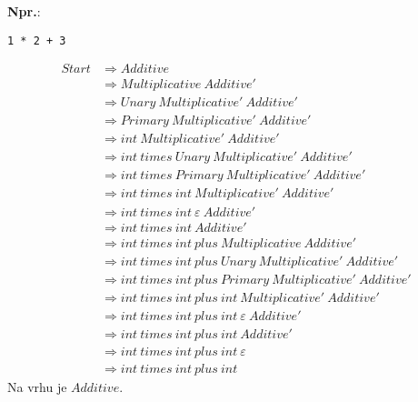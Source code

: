 \documentclass{report}
\newcommand{\Ex}{\textbf{Npr.}:\ }
\newcommand{\Null}{\varepsilon}
\newcommand{\Spc}{\ }
\newlength{\arrow}
\newcommand{\Derive}{\Rightarrow}
\newcommand{\NT}[1]{{#1}}
\newcommand{\T}[1]{{#1}}
\begin{document}
\Ex
\begin{lstlisting}
1 * 2 + 3
\end{lstlisting}
\begin{equation*}
  \begin{aligned}
    \NT{Start} &\Derive \NT{Additive}\\
    &\Derive \NT{Multiplicative} \Spc \NT{Additive'}\\
    &\Derive \NT{Unary} \Spc \NT{Multiplicative'} \Spc \NT{Additive'}\\
    &\Derive \NT{Primary} \Spc \NT{Multiplicative'} \Spc \NT{Additive'}\\
    &\Derive \T{int} \Spc \NT{Multiplicative'} \Spc \NT{Additive'}\\
    &\Derive \T{int} \Spc \T{times} \Spc \NT{Unary} \Spc \NT{Multiplicative'} \Spc \NT{Additive'}\\
    &\Derive \T{int} \Spc \T{times} \Spc \NT{Primary} \Spc \NT{Multiplicative'} \Spc \NT{Additive'}\\
    &\Derive \T{int} \Spc \T{times} \Spc \T{int} \Spc \NT{Multiplicative'} \Spc \NT{Additive'}\\
    &\Derive \T{int} \Spc \T{times} \Spc \T{int} \Spc \Null \Spc \NT{Additive'}\\
    &\Derive \T{int} \Spc \T{times} \Spc \T{int} \Spc \NT{Additive'}\\
    &\Derive \T{int} \Spc \T{times} \Spc \T{int} \Spc \T{plus} \Spc \NT{Multiplicative} \Spc \NT{Additive'}\\
    &\Derive \T{int} \Spc \T{times} \Spc \T{int} \Spc \T{plus} \Spc \NT{Unary} \Spc \NT{Multiplicative'} \Spc \NT{Additive'}\\
    &\Derive \T{int} \Spc \T{times} \Spc \T{int} \Spc \T{plus} \Spc \NT{Primary} \Spc \NT{Multiplicative'} \Spc \NT{Additive'}\\
    &\Derive \T{int} \Spc \T{times} \Spc \T{int} \Spc \T{plus} \Spc \T{int} \Spc \NT{Multiplicative'} \Spc \NT{Additive'}\\
    &\Derive \T{int} \Spc \T{times} \Spc \T{int} \Spc \T{plus} \Spc \T{int} \Spc \Null \Spc \NT{Additive'}\\
    &\Derive \T{int} \Spc \T{times} \Spc \T{int} \Spc \T{plus} \Spc \T{int} \Spc \NT{Additive'}\\
    &\Derive \T{int} \Spc \T{times} \Spc \T{int} \Spc \T{plus} \Spc \T{int} \Spc \Null\\
    &\Derive \T{int} \Spc \T{times} \Spc \T{int} \Spc \T{plus} \Spc \T{int}
  \end{aligned}
\end{equation*}
Na vrhu je $\NT{Additive}$.
\end{document}
